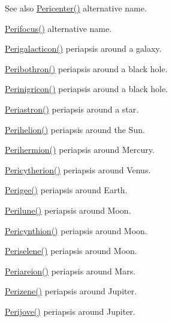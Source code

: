 \begin{DoxySeeAlso}{See also}
\mbox{\hyperlink{group___e_g_x_phys-_periapsis_gaa769950fdad108083236bb0efded1196}{Pericenter()}} alternative name. 

\mbox{\hyperlink{group___e_g_x_phys-_periapsis_ga569c67766dd7b590c630caa6582ad000}{Perifocus()}} alternative name. 

\mbox{\hyperlink{group___e_g_x_phys-_periapsis_ga05df9ab5aa8e1efa938f740b894ade25}{Perigalacticon()}} periapsis around a galaxy. 

\mbox{\hyperlink{group___e_g_x_phys-_periapsis_gad43bb3a6be82521d41d7a55453dec47e}{Peribothron()}} periapsis around a black hole. 

\mbox{\hyperlink{group___e_g_x_phys-_periapsis_ga2de34009308e46d1d3bd4eb8cd4b0a8d}{Perinigricon()}} periapsis around a black hole. 

\mbox{\hyperlink{group___e_g_x_phys-_periapsis_gaf3c623561998f107496fb7341698ae9d}{Periastron()}} periapsis around a star. 

\mbox{\hyperlink{group___e_g_x_phys-_periapsis_ga10f870e17f51680c5df8731c1a7848cf}{Perihelion()}} periapsis around the Sun. 

\mbox{\hyperlink{group___e_g_x_phys-_periapsis_ga4e2090fddafea2fca70acd6f7a1eddc4}{Perihermion()}} periapsis around Mercury. 

\mbox{\hyperlink{group___e_g_x_phys-_periapsis_ga8abbd484b4a6e0958000c91644cbb8ee}{Pericytherion()}} periapsis around Venus. 

\mbox{\hyperlink{group___e_g_x_phys-_periapsis_gac6e1edb1916ff1a37f4bc0b01e6511d4}{Perigee()}} periapsis around Earth. 

\mbox{\hyperlink{group___e_g_x_phys-_periapsis_gac305fe72a19c1126bc7e72ef1de873a0}{Perilune()}} periapsis around Moon. 

\mbox{\hyperlink{group___e_g_x_phys-_periapsis_ga101f47cc9ce1eb98aeec35fa5c9ba9e4}{Pericynthion()}} periapsis around Moon. 

\mbox{\hyperlink{group___e_g_x_phys-_periapsis_ga91c6e1f3b6f98fe053bec87efcff4364}{Periselene()}} periapsis around Moon. 

\mbox{\hyperlink{group___e_g_x_phys-_periapsis_ga27fbf6beeae240a9eeea35dae65b089a}{Periareion()}} periapsis around Mars. 

\mbox{\hyperlink{group___e_g_x_phys-_periapsis_ga8899642f7f872817c611240819b2b968}{Perizene()}} periapsis around Jupiter. 

\mbox{\hyperlink{group___e_g_x_phys-_periapsis_gae1daec11bd7b479853ba92ca6368a23c}{Perijove()}} periapsis around Jupiter. 


\end{DoxySeeAlso}
